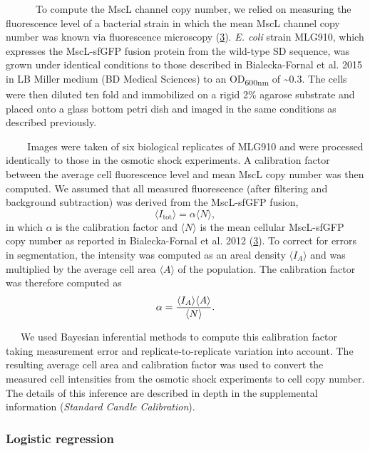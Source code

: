 ~ ~ ~
~To
compute
the
MscL
channel
copy
number,
we
relied
on
measuring
the
fluorescence
level
of a
bacterial
strain
in
which
the
mean
MscL
channel
copy
number
was
known
via
fluorescence
microscopy
(\protect\hyperlink{ref-bialecka-fornal2012}{3}).
\emph{E.
coli}
strain
MLG910,
which
expresses
the
MscL-sfGFP
fusion
protein
from
the
wild-type
SD
sequence,
was
grown
under
identical
conditions
to
those
described
in
Bialecka-Fornal
et al.
2015
in LB
Miller
medium
(BD
Medical
Sciences)
to an
OD\textsubscript{600nm}
of
\textasciitilde{}0.3.
The
cells
were
then
diluted
ten
fold
and
immobilized
on a
rigid
2\%
agarose
substrate
and
placed
onto a
glass
bottom
petri
dish
and
imaged
in the
same
conditions
as
described
previously.

~ ~
~Images
were
taken
of six
biological
replicates
of
MLG910
and
were
processed
identically
to
those
in the
osmotic
shock
experiments.
A
calibration
factor
between
the
average
cell
fluorescence
level
and
mean
MscL
copy
number
was
then
computed.
We
assumed
that
all
measured
fluorescence
(after
filtering
and
background
subtraction)
was
derived
from
the
MscL-sfGFP
fusion,
\begin{equation}
\langle I_\text{tot}\rangle = \alpha \langle N \rangle,
\label{eq:ian}\end{equation}
in
which
\(\alpha\)
is the
calibration
factor
and
\(\langle N \rangle\)
is the
mean
cellular
MscL-sfGFP
copy
number
as
reported
in
Bialecka-Fornal
et al.
2012
(\protect\hyperlink{ref-bialecka-fornal2012}{3}).
To
correct
for
errors
in
segmentation,
the
intensity
was
computed
as an
areal
density
\(\langle I_A \rangle\)
and
was
multiplied
by the
average
cell
area
\(\langle A \rangle\)
of the
population.
The
calibration
factor
was
therefore
computed
as
\begin{equation}
\alpha = {\langle I_A \rangle \langle A \rangle \over \langle N \rangle}.
\label{eq:calibration_factor}\end{equation}

~~~We
used
Bayesian
inferential
methods
to
compute
this
calibration
factor
taking
measurement
error
and
replicate-to-replicate
variation
into
account.
The
resulting
average
cell
area
and
calibration
factor
was
used
to
convert
the
measured
cell
intensities
from
the
osmotic
shock
experiments
to
cell
copy
number.
The
details
of
this
inference
are
described
in
depth
in the
supplemental
information
(\emph{Standard
Candle
Calibration}).

\subsubsection{Logistic
regression}\label{logistic-regression}

